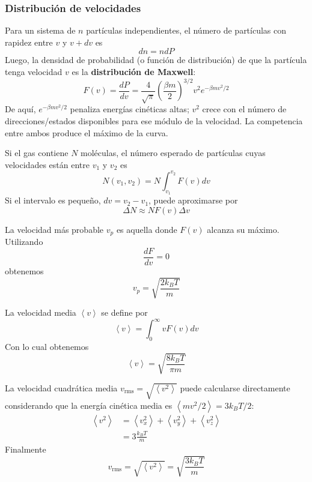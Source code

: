 \documentclass[]{article}
\numberwithin{equation}{section}
\newcommand{\0}{\textcolor{gray}{0}}
\newcommand{\td}[2]{\dfrac{d #1}{d #2}}
\begin{document}
\subsubsection{Distribución de velocidades}
Para un sistema de \(n\) partículas independientes, el número de partículas con rapidez entre \(v\) y \(v + dv\) es
\begin{equation*}
	dn = n dP
\end{equation*}
Luego, la densidad de probabilidad (o función de distribución) de que la partícula tenga velocidad \(v\) es la \textbf{distribución de Maxwell}:
\begin{equation}
	F(v) = \frac{dP}{dv} = \frac{4}{\sqrt{\pi}}\left(\frac{\beta m}{2}\right)^{3/2} v^2 e^{-\beta m v^2/2}
\end{equation}
De aquí, \(e^{-\beta m v^2/2}\) penaliza energías cinéticas altas; \(v^2\) crece con el número de direcciones/estados disponibles para ese módulo de la velocidad. La competencia entre ambos produce el máximo de la curva.

Si el gas contiene \(N\) moléculas, el número esperado de partículas cuyas velocidades están entre \(v_1\) y \(v_2\) es
\begin{equation}
	N(v_1,v_2) = N \int_{v_1}^{v_2} F(v) dv
\end{equation}
Si el intervalo es pequeño, \(dv = v_2 - v_1\), puede aproximarse por
\begin{equation}
	\Delta N \approx NF(v)\Delta v
\end{equation}

La velocidad más probable \(v_p\) es aquella donde \(F (v)\) alcanza su máximo. Utilizando
\begin{equation*}
	\td{F}{v} = 0
\end{equation*}
obtenemos
\begin{equation}
	v_p = \sqrt{\frac{2 k_B T}{m}}
\end{equation}

La velocidad media \(\left\langle v\right\rangle \) se define por
\begin{equation*}
	\left\langle v\right\rangle = \int_{0}^{\infty}vF(v)dv
\end{equation*}
Con lo cual obtenemos
\begin{equation}
	\left\langle v\right\rangle = \sqrt{\frac{8 k_B T}{\pi m}}
\end{equation}

La velocidad cuadrática media \(v_\mathrm{rms} = \sqrt{\left\langle v^2 \right\rangle}\) puede calcularse directamente considerando que la energía cinética media es \(\left\langle m v^2/2 \right\rangle = 3k_B T/2\):
\begin{align*}
	\left\langle v^2 \right\rangle &= \left\langle v_x^2 \right\rangle + \left\langle v_y^2 \right\rangle + \left\langle v_z^2 \right\rangle\\
	&= 3\frac{k_B T}{m}
\end{align*}
Finalmente
\begin{equation}
	v_\mathrm{rms} = \sqrt{\left\langle v^2 \right\rangle} = \sqrt{\frac{3 k_B T}{m}}
\end{equation}
\end{document}

